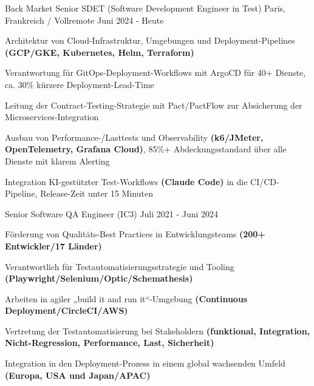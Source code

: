 
\begin{cventries}

  \cventry
  {Back Market }
  {Senior SDET (Software Development Engineer in Test)}
  {Paris, Frankreich / Vollremote}
  {Juni 2024 - Heute}
  {
    \begin{cvitems}
      \item{Architektur von Cloud-Infrastruktur, Umgebungen und Deployment-Pipelines \textbf{(GCP/GKE, Kubernetes, Helm, Terraform)}}
      \item{Verantwortung für GitOps-Deployment-Workflows mit ArgoCD für 40+ Dienste, ca. 30\% kürzere Deployment-Lead-Time}
      \item{Leitung der Contract-Testing-Strategie mit Pact/PactFlow zur Absicherung der Microservices-Integration}
      \item{Ausbau von Performance-/Lasttests und Observability \textbf{(k6/JMeter, OpenTelemetry, Grafana Cloud)}, 85\%+ Abdeckungsstandard über alle Dienste mit klarem Alerting}
      \item{Integration KI-gestützter Test-Workflows \textbf{(Claude Code)} in die CI/CD-Pipeline, Release-Zeit unter 15 Minuten}
    \end{cvitems}
    \vspace{0.75em}
  }

  \cventry
  {}
  {Senior Software QA Engineer (IC3)}
  {}
  {Juli 2021 - Juni 2024}
  {
    \begin{cvitems}
      \item{Förderung von Qualitäts-Best Practices in Entwicklungsteams \textbf{(200+ Entwickler/17 Länder)}}
      \item{Verantwortlich für Testautomatisierungsstrategie und Tooling \textbf{(Playwright/Selenium/Optic/Schemathesis)}}
      \item{Arbeiten in agiler „build it and run it“-Umgebung \textbf{(Continuous Deployment/CircleCI/AWS)}}
      \item{Vertretung der Testautomatisierung bei Stakeholdern \textbf{(funktional, Integration, Nicht-Regression, Performance, Last, Sicherheit)}}
      \item{Integration in den Deployment-Prozess in einem global wachsenden Umfeld \textbf{(Europa, USA und Japan/APAC)}}
    \end{cvitems}
    \vspace{0.75em}
  }


\end{cventries}
